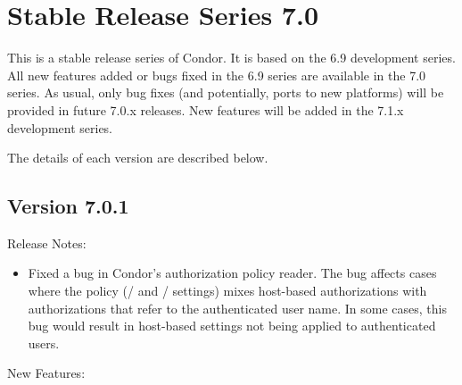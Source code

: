 
\section{\label{sec:History-7-0}Stable Release Series 7.0}

This is a stable release series of Condor.
It is based on the 6.9 development series.
All new features added or bugs fixed in the 6.9 series are available
in the 7.0 series.
As usual, only bug fixes (and potentially, ports to new platforms)
will be provided in future 7.0.x releases.
New features will be added in the 7.1.x development series.

The details of each version are described below.

\subsection*{\label{sec:New-7-0-1}Version 7.0.1}

\noindent Release Notes:

\begin{itemize}

\item Fixed a bug in Condor's authorization policy reader.  The bug
affects cases where the policy (/ and
/ settings) mixes host-based
authorizations with authorizations that refer to the authenticated
user name.  In some cases, this bug would result in host-based
settings not being applied to authenticated users.

\end{itemize}

\noindent New Features:

